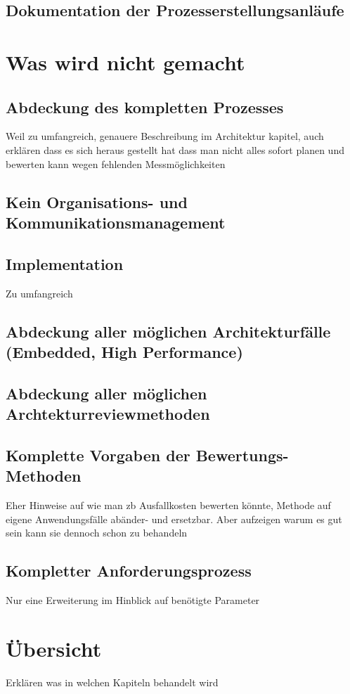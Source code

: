 \documentclass[Master,MSE,german]{twbook}
\begin{document}
\subsection{Dokumentation der Prozesserstellungsanläufe}

\section{Was wird nicht gemacht}
\subsection{Abdeckung des kompletten Prozesses}
Weil zu umfangreich, genauere Beschreibung im Architektur kapitel, auch erklären dass es sich heraus gestellt hat dass man nicht alles sofort planen und bewerten kann wegen fehlenden Messmöglichkeiten
\subsection{Kein Organisations- und Kommunikationsmanagement}
\subsection{Implementation}
Zu umfangreich
\subsection{Abdeckung aller möglichen Architekturfälle (Embedded, High Performance)}
\subsection{Abdeckung aller möglichen Archtekturreviewmethoden}
\subsection{Komplette Vorgaben der Bewertungs-Methoden}
Eher Hinweise auf wie man zb Ausfallkosten bewerten könnte, Methode auf eigene Anwendungsfälle abänder- und ersetzbar. Aber aufzeigen warum es gut sein kann sie dennoch schon zu behandeln
\subsection{Kompletter Anforderungsprozess}
Nur eine Erweiterung im Hinblick auf benötigte Parameter

\section{Übersicht}
Erklären was in welchen Kapiteln behandelt wird
\end{document}
